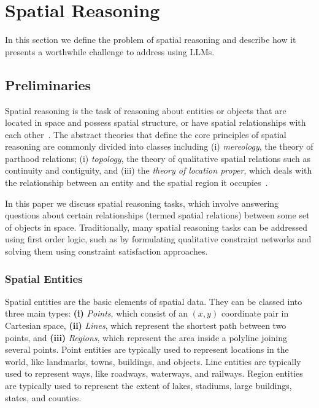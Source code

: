 \section{Spatial Reasoning}
\label{section:background}

In this section we define the problem of spatial reasoning and describe how it presents a worthwhile challenge to address using LLMs.

\subsection{Preliminaries}
Spatial reasoning is the task of reasoning about entities or objects that are located in space and possess spatial structure, or have spatial relationships with each other~\cite{Varzi2007}.
The abstract theories that define the core principles of spatial reasoning are commonly divided into classes including 
(i) \textit{mereology}, the theory of parthood relations;
(i) \textit{topology}, the theory of qualitative spatial relations such as continuity and contiguity, and 
(iii) the \textit{theory of location proper}, which deals with the relationship between an entity and the spatial region it
occupies~\cite{Varzi2007}.

In this paper we discuss spatial reasoning tasks, which involve answering questions about certain relationships (termed spatial relations) between some set of objects in space.
Traditionally, many spatial reasoning tasks can be addressed using first order logic, such as by formulating qualitative constraint networks and solving them using constraint satisfaction approaches.



\subsubsection{Spatial Entities}
Spatial entities are the basic elements of spatial data.
They can be classed into three main types: \textbf{(i)} \textit{Points}, which consist of an $(x,y)$ coordinate pair in Cartesian space, \textbf{(ii)} \textit{Lines}, which represent the shortest path between two points, and \textbf{(iii)} \textit{Regions}, which represent the area inside a polyline joining several points. 
Point entities are typically used to represent locations in the world, like landmarks, towns, buildings, and objects.
Line entities are typically used to represent ways, like roadways, waterways, and railways.
Region entities are typically used to represent the extent of lakes, stadiums, large buildings, states, and counties.


